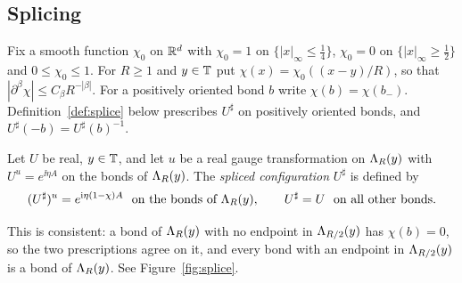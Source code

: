 \subsection{Splicing}\label{ss:28.4}

Fix a smooth function $\chi_0$ on $\mathbb R^d$ with $\chi_0=1$ on $\{|x|_\infty\le\frac14\}$, $\chi_0=0$ on $\{|x|_\infty\ge\frac12\}$ and $0\le\chi_0\le1$. For $R\ge1$ and $y\in\mathbb T$ put $\chi(x)=\chi_0((x-y)/R)$, so that $|\partial^\beta\chi|\le C_\beta R^{-|\beta|}$. For a positively oriented bond $b$ write $\chi(b)=\chi(b_-)$. Definition~\ref{def:splice} below prescribes $U^\sharp$ on positively oriented bonds, and $U^\sharp(-b)=U^\sharp(b)^{-1}$.

\begin{definition}\label{def:splice}
Let $U$ be real, $y\in\mathbb T$, and let $u$ be a real gauge transformation on $\Lambda_R(y)$ with $U^u=e^{\ii\eta A}$ on the bonds of $\Lambda_R(y)$. The \emph{spliced configuration} $U^\sharp$ is defined by
\[
(U^\sharp)^u=e^{\mathrm i\eta(1-\chi)A}\ \text{ on the bonds of }\Lambda_R(y),\qquad U^\sharp=U\ \text{ on all other bonds.}
\]
\end{definition}

This is consistent: a bond of $\Lambda_R(y)$ with no endpoint in $\Lambda_{R/2}(y)$ has $\chi(b)=0$, so the two prescriptions agree on it, and every bond with an endpoint in $\Lambda_{R/2}(y)$ is a bond of $\Lambda_R(y)$. See Figure~\ref{fig:splice}.

